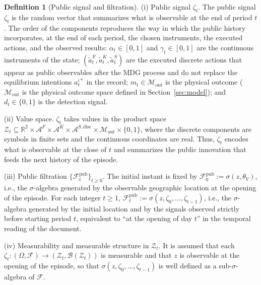 \documentclass[review,authoryear,12pt]{elsarticle}
\theoremstyle{plain}
\theoremstyle{definition}
\newtheorem{definition}[theorem]{Definition}
\newcommand{\1}{\mathbf{1}}
\begin{document}
\begin{definition}[Public signal and filtration]
\label{def:zeta-filtration}
\noindent\textup{(i)} Public signal $\zeta_t$.\quad
The public signal $\zeta_t$ is the random vector that summarizes what is observable at the end of period $t$. The order of the components reproduces the way in which the public history incorporates, at the end of each period, the chosen instruments, the executed actions, and the observed results:
 $\alpha_t\in[0,1]$ and $\gamma_t\in[0,1]$ are the continuous instruments of the state; $(\tilde{a}_t^F,\tilde{a}_t^K,\tilde{a}_t^S)$ are the executed discrete actions that appear as public observables after the MDG process and do not replace the equilibrium intentions $a_t^{i\ast}$ in the record; $m_t\in\mathcal{M}_{\mathrm{out}}$ is the physical outcome \textup{(}$\mathcal{M}_{\mathrm{out}}$ is the physical outcome space defined in Section~\ref{sec:model}\textup{)}; and $d_t\in\{0,1\}$ is the detection signal.

\medskip
\noindent\textup{(ii)} Value space.\quad
$\zeta_t$ takes values in the product space $\mathcal{Z}_t \subseteq \mathbb{R}^2 \times \mathcal{A}^F \times \mathcal{A}^K \times \mathcal{A}^{S,\mathrm{disc}} \times \mathcal{M}_{\mathrm{out}} \times \{0,1\}$, where the discrete components are symbols in finite sets and the continuous coordinates are real. Thus, $\zeta_t$ encodes what is observable at the close of $t$ and summarizes the public innovation that feeds the next history of the episode.

\medskip
\noindent\textup{(iii)} Public filtration $\{\mathcal{F}_t^{\mathrm{pub}}\}_{t\ge 0}$.\quad
The initial instant is fixed by $\mathcal{F}_0^{\mathrm{pub}}:=\sigma(z, \theta_V)$, i.e., the $\sigma$-algebra generated by the observable geographic location at the opening of the episode. For each integer $t\ge 1$, $\mathcal{F}_t^{\mathrm{pub}}:=\sigma(z,\zeta_0,\ldots,\zeta_{t-1})$, i.e., the $\sigma$-algebra generated by the initial location and by the signals observed strictly before starting period $t$, equivalent to ``at the opening of day $t$'' in the temporal reading of the document.

\smallskip
\noindent\textup{(iv)} Measurability and measurable structure in $\mathcal{Z}_t$.\quad
It is assumed that each $\zeta_t:(\Omega,\mathcal{F})\to(\mathcal{Z}_t,\mathcal{B}(\mathcal{Z}_t))$ is measurable and that $z$ is observable at the opening of the episode, so that $\sigma(z,\zeta_0,\ldots,\zeta_{t-1})$ is well defined as a sub-$\sigma$-algebra of $\mathcal{F}$.
\end{definition}
\end{document}
